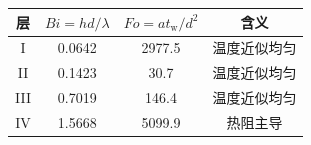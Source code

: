 \begin{tabular}{cccc}
  \toprule
    层 & $\mathit{Bi}=h d/\lambda$ & $\mathit{Fo}=a t_{\mathrm{w}}/d^2$ & 含义 \\
  \midrule
    I & 0.0642 & 2977.5 & 温度近似均匀 \\
    II & 0.1423 & 30.7 & 温度近似均匀 \\
    III & 0.7019 & 146.4 & 温度近似均匀 \\
    IV & 1.5668 & 5099.9 & 热阻主导 \\
  \bottomrule
\end{tabular}
